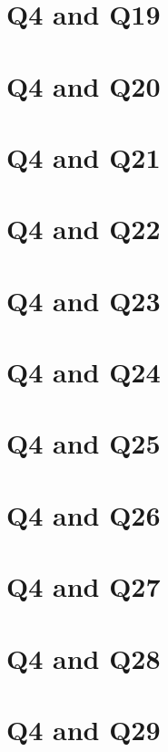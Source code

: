 \documentclass{report}
\begin{document}
\clearpage
\section{Q4 and Q19}


\clearpage
\section{Q4 and Q20}


\clearpage
\section{Q4 and Q21}


\clearpage
\section{Q4 and Q22}


\clearpage
\section{Q4 and Q23}


\clearpage
\section{Q4 and Q24}


\clearpage
\section{Q4 and Q25}


\clearpage
\section{Q4 and Q26}


\clearpage
\section{Q4 and Q27}


\clearpage
\section{Q4 and Q28}


\clearpage
\section{Q4 and Q29}

\end{document}
